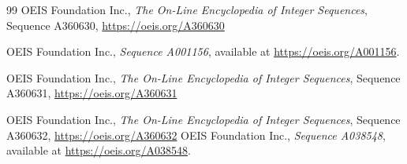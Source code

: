 \documentclass[12pt,a4paper]{amsart}
\numberwithin{equation}{section}
\theoremstyle{plain}
\theoremstyle{definition}
\theoremstyle{remark}
\begin{document}
\begin{thebibliography}{99}
OEIS Foundation Inc.,
\emph{The On-Line Encyclopedia of Integer Sequences},
Sequence A360630,
\url{https://oeis.org/A360630}

OEIS Foundation Inc.,
\emph{Sequence A001156},
available at \url{https://oeis.org/A001156}.

OEIS Foundation Inc.,
\emph{The On-Line Encyclopedia of Integer Sequences},
Sequence A360631,
\url{https://oeis.org/A360631}


OEIS Foundation Inc.,
\emph{The On-Line Encyclopedia of Integer Sequences},
Sequence A360632,
\url{https://oeis.org/A360632}
OEIS Foundation Inc.,
\emph{Sequence A038548},
available at \url{https://oeis.org/A038548}.

\end{thebibliography}
\end{document}
